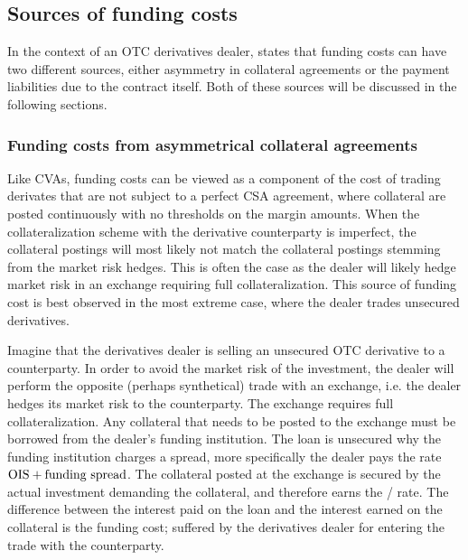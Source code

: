 \documentclass[../../../main.tex]{subfiles}
\begin{document}
    \subsection{Sources of funding costs}
        In the context of an OTC derivatives dealer,
        \cite{Ruiz2013FVA} states that funding costs can have two different sources,
        either asymmetry in collateral agreements or the payment liabilities due to the contract itself.
        Both of these sources will be discussed in the following sections.

    \subsubsection{Funding costs from asymmetrical collateral agreements}
        Like CVAs, funding costs can be viewed as a component of the cost of trading derivates
        that are not subject to a perfect CSA agreement, 
        where collateral are posted continuously with no thresholds on the margin amounts. 
        When the collateralization scheme with the derivative counterparty is imperfect, 
        the collateral postings will most likely not match the collateral postings stemming from the market risk hedges.
        This is often the case as the dealer will likely hedge market risk in an exchange requiring full collateralization.
        This source of funding cost is best observed in the most extreme case, where the dealer trades unsecured derivatives. 

        Imagine that the derivatives dealer is selling an unsecured OTC derivative to a counterparty.
        In order to avoid the market risk of the investment, 
        the dealer will perform the opposite (perhaps synthetical) trade with an exchange,
        i.e. the dealer hedges its market risk to the counterparty.
        The exchange requires full collateralization.
        Any collateral that needs to be posted to the exchange must be borrowed from the dealer's funding institution.
        The loan is unsecured why the funding institution charges a spread,
        more specifically the dealer pays the rate $\OIS/ + \text{funding spread}$.
        The collateral posted at the exchange is secured by the actual investment demanding the collateral,
        and therefore earns the \OIS/ rate.
        The difference between the interest paid on the loan and the interest earned on the collateral is the funding cost;
        suffered by the derivatives dealer for entering the trade with the counterparty. 
\end{document}
